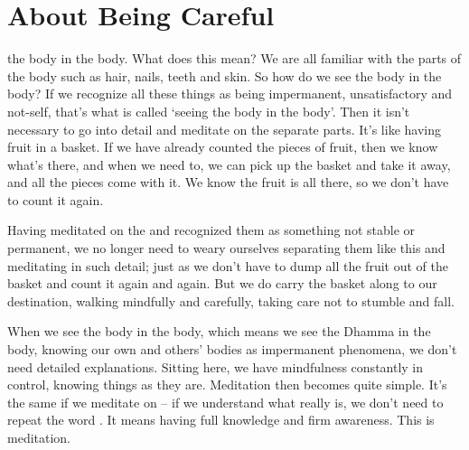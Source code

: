 
\chapter{About Being Careful}

 the body in the body. What does this mean? We are all familiar with the parts of the body such as hair, nails, teeth and skin. So how do we see the body in the body? If we recognize all these things as being impermanent, unsatisfactory and not-self, that's what is called `seeing the body in the body'. Then it isn't necessary to go into detail and meditate on the separate parts. It's like having fruit in a basket. If we have already counted the pieces of fruit, then we know what's there, and when we need to, we can pick up the basket and take it away, and all the pieces come with it. We know the fruit is all there, so we don't have to count it again. 

Having meditated on the  and recognized them as something not stable or permanent, we no longer need to weary ourselves separating them like this and meditating in such detail; just as we don't have to dump all the fruit out of the basket and count it again and again. But we do carry the basket along to our destination, walking mindfully and carefully, taking care not to stumble and fall. 

When we see the body in the body, which means we see the Dhamma in the body, knowing our own and others' bodies as impermanent phenomena, we don't need detailed explanations. Sitting here, we have mindfulness constantly in control, knowing things as they are. Meditation then becomes quite simple. It's the same if we meditate on  -- if we understand what  really is, we don't need to repeat the word . It means having full knowledge and firm awareness. This is meditation. 

